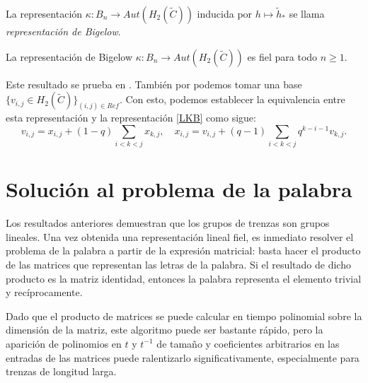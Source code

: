 \documentclass[TFG.tex]{subfiles}
\begin{document}
\begin{defi}
La representación $\kappa:B_n\to Aut(H_2(\widetilde{C}))$ inducida por $h\mapsto\tilde{h}_*$ se llama \emph{representación de Bigelow}.
\end{defi}

\begin{teorema}
La representación de Bigelow $\kappa:B_n\to Aut(H_2(\widetilde{C}))$ es fiel para todo $n\geq 1$.
\end{teorema}

Este resultado se prueba en \cite{Bil}. También por \cite{Bil} podemos tomar una base $\{v_{i,j}\in H_2(\widetilde{C})\}_{(i,j)\in Ref}$. Con esto, podemos establecer la equivalencia \cite{nundam} entre esta representación y la representación  \ref{LKB} como sigue:
\[
v_{i,j}=x_{i,j}+(1-q)\sum_{i<k<j}x_{k,j},\quad x_{i,j}=v_{i,j}+(q-1)\sum_{i<k<j}q^{k-i-1}v_{k,j}.
\]


\section{Solución al problema de la palabra}
Los resultados anteriores demuestran que los grupos de trenzas son grupos lineales. Una vez obtenida una representación lineal fiel, es inmediato resolver el problema de la palabra a partir de la expresión matricial: basta hacer el producto de las matrices que representan las letras de la palabra. Si el resultado de dicho producto es la matriz identidad, entonces la palabra representa el elemento trivial y recíprocamente.

Dado que el producto de matrices se puede calcular en tiempo polinomial sobre la dimensión de la matriz, este algoritmo puede ser bastante rápido, pero la aparición de polinomios en $t$ y $t^{-1}$ de tamaño y coeficientes arbitrarios en las entradas de las matrices puede ralentizarlo significativamente, especialmente para trenzas de longitud larga.
\end{document}
